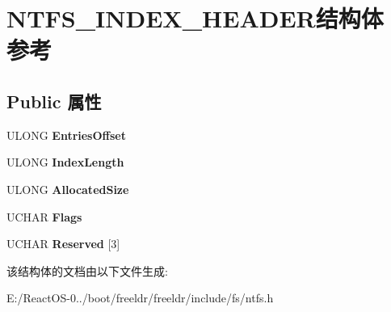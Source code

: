 \hypertarget{struct_n_t_f_s___i_n_d_e_x___h_e_a_d_e_r}{}\section{N\+T\+F\+S\+\_\+\+I\+N\+D\+E\+X\+\_\+\+H\+E\+A\+D\+E\+R结构体 参考}
\label{struct_n_t_f_s___i_n_d_e_x___h_e_a_d_e_r}
\subsection*{Public 属性}
\begin{DoxyCompactItemize}
\item 
\mbox{\label{struct_n_t_f_s___i_n_d_e_x___h_e_a_d_e_r_ab85e146df8c95d0fdb128284f01adb22}} 
U\+L\+O\+NG {\bfseries Entries\+Offset}
\item 
\mbox{\label{struct_n_t_f_s___i_n_d_e_x___h_e_a_d_e_r_a8c639629b61413422fb3036894fd33e0}} 
U\+L\+O\+NG {\bfseries Index\+Length}
\item 
\mbox{\label{struct_n_t_f_s___i_n_d_e_x___h_e_a_d_e_r_aa3d5340f6617bbf66496eb1e95560df3}} 
U\+L\+O\+NG {\bfseries Allocated\+Size}
\item 
\mbox{\label{struct_n_t_f_s___i_n_d_e_x___h_e_a_d_e_r_a8e30b6aebd58e2d6a2c48c7f8a42b903}} 
U\+C\+H\+AR {\bfseries Flags}
\item 
\mbox{\label{struct_n_t_f_s___i_n_d_e_x___h_e_a_d_e_r_a6a33d480ab1be6e5a104da9f28cfd09e}} 
U\+C\+H\+AR {\bfseries Reserved} \mbox{[}3\mbox{]}
\end{DoxyCompactItemize}


该结构体的文档由以下文件生成\+:\begin{DoxyCompactItemize}
\item 
E\+:/\+React\+O\+S-\/0../boot/freeldr/freeldr/include/fs/ntfs.\+h\end{DoxyCompactItemize}
